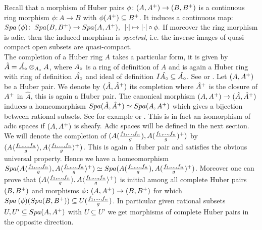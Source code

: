 Recall that a morphism of Huber pairs $\phi\colon(A, A{^{+}})\to(B, B{^{+}})$ is a continuous ring morphism $\phi\colon A\to B$ with $\phi(A{^{+}})\subseteq B{^{+}}$. It induces a continuous map:\\
${Spa{\:(\phi)}}\colon\:{Spa({B},{B{^{+}}})}\to{Spa({A},{A{^{+}}})},\:\: \lvert\cdot\rvert\mapsto\lvert\cdot\rvert\circ\phi.$
If moreover the ring morphism is adic, then the induced morphism is \emph{spectral}, i.e. the inverse images of quasi-compact open subsets are quasi-compact.\\

The completion of a Huber ring $A$ takes a particular form, 
it is given by $\hat{A}=\hat{A{_{\circ}}}\mathbin{\otimes}_{A{_{\circ}}}A$, where $A{_{\circ}}$ is a ring of definition of $A$ and is again a Huber ring with ring of definition $\hat{A{_{\circ}}}$ and ideal of definition
$I\hat{A{_{\circ}}}\subseteq\hat{A{_{\circ}}}$.
See \cite[lemma 1.6]{Huber93} or \cite[corollary II.3.1.9]{Morel19}. Let $(A, A{^{+}})$ be a Huber pair. We denote by 
$(\hat{A}, \hat{A}{^{+}})$ its completion where $\hat{A}{^{+}}$ is the closure of $A{^{+}}$ in $\hat{A}$, this is again a Huber pair. The canonical morphism $(A, A{^{+}})\to(\hat{A}, \hat{A}{^{+}})$ induces a homeomorphism 
${Spa({\hat{A}},{\hat{A}{^{+}}})}\simeq{Spa({A},{A{^{+}}})}$ which gives a bijection between rational subsets.
See for example \cite[proposition 3.9]{Huber93} or \cite[corollary II.3.1.12, corollary III.4.2.2]{Morel19}. This is in fact an isomorphism of adic spaces if
$(A, A{^{+}})$ is sheafy. Adic spaces will be defined in the next section.
We will denote the completion of $(A(\tfrac{f_1,\dots,f_n}{g}), A(\tfrac{f_1,\dots,f_n}{g}){^{+}})$
by $(A\langle\tfrac{f_1,\dots,f_n}{g}\rangle, A\langle\tfrac{f_1,\dots,f_n}{g}\rangle{^{+}})$. This is again a Huber pair and satisfies the obvious universal property. Hence we have a homeomorphism
${Spa({A\langle\tfrac{f_1,\dots,f_n}{g}\rangle},{ A\langle\tfrac{f_1,\dots,f_n}{g}\rangle{^{+}}})}\simeq{Spa({A(\tfrac{f_1,\dots,f_n}{g})},{A(\tfrac{f_1,\dots,f_n}{g}){^{+}}})}$.
Moreover one can prove that 
$(A\langle\tfrac{f_1,\dots,f_n}{g}\rangle, A\langle\tfrac{f_1,\dots,f_n}{g}\rangle{^{+}})$ 
is initial among all complete Huber pairs $(B, B{^{+}})$ and morphisms $\phi\colon(A, A{^{+}})\to (B, B{^{+}})$ for which ${Spa{\:(\phi)}}({Spa({B},{B{^{+}}})})\subseteq U(\tfrac{f_1,\dots,f_n}{g})$.
In particular given rational subsets $U, U'\subseteq{Spa({A},{A{^{+}}})}$ with $U\subseteq U'$ we get morphisms of complete Huber pairs in the opposite direction.\\


















